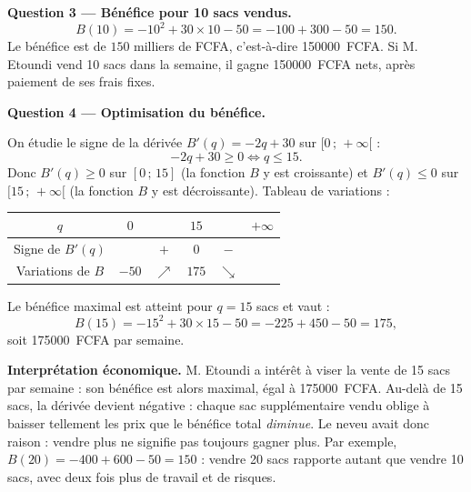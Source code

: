 \documentclass[11pt]{article}
\begin{document}
\begin{exoresolu}
\textbf{Question 3 — Bénéfice pour 10 sacs vendus.}
\[ B(10) = -10^2 + 30 \times 10 - 50 = -100 + 300 - 50 = 150. \]
Le bénéfice est de $150$ milliers de FCFA, c'est-à-dire \SI{150000}{FCFA}. Si M. Etoundi vend 10 sacs dans la semaine, il gagne \SI{150000}{FCFA} nets, après paiement de ses frais fixes.

\medskip

\textbf{Question 4 — Optimisation du bénéfice.}

On étudie le signe de la dérivée $B'(q) = -2q + 30$ sur $[0\,;\,+\infty[$ :
\[ -2q + 30 \geq 0 \iff q \leq 15. \]
Donc $B'(q) \geq 0$ sur $[0\,;\,15]$ (la fonction $B$ y est croissante) et $B'(q) \leq 0$ sur $[15\,;\,+\infty[$ (la fonction $B$ y est décroissante). Tableau de variations :

\begin{center}
\begin{tabular}{|c|ccccc|}
\hline
\rowcolor{popblueL} $q$ & $0$ & & $15$ & & $+\infty$ \\
\hline
Signe de $B'(q)$ & & $+$ & $0$ & $-$ & \\
\hline
Variations de $B$ & $-50$ & $\nearrow$ & $175$ & $\searrow$ & \\
\hline
\end{tabular}
\end{center}

Le bénéfice maximal est atteint pour $q = 15$ sacs et vaut :
\[ B(15) = -15^2 + 30 \times 15 - 50 = -225 + 450 - 50 = 175, \]
soit \SI{175000}{FCFA} par semaine.

\medskip

\textbf{Interprétation économique.} M. Etoundi a intérêt à viser la vente de 15 sacs par semaine : son bénéfice est alors maximal, égal à \SI{175000}{FCFA}. Au-delà de 15 sacs, la dérivée devient négative : chaque sac supplémentaire vendu oblige à baisser tellement les prix que le bénéfice total \emph{diminue}. Le neveu avait donc raison : vendre plus ne signifie pas toujours gagner plus. Par exemple, $B(20) = -400 + 600 - 50 = 150$ : vendre 20 sacs rapporte autant que vendre 10 sacs, avec deux fois plus de travail et de risques.


\end{exoresolu}
\end{document}
